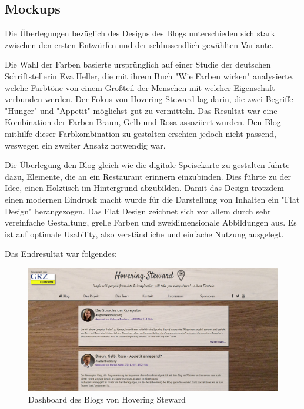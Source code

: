     \subsection*{Mockups}
    Die Überlegungen bezüglich des Designs des Blogs unterschieden sich stark zwischen den ersten
    Entwürfen und der schlussendlich gewählten Variante.

    Die Wahl der Farben basierte ursprünglich auf einer Studie der deutschen Schriftstellerin Eva Heller,
    die mit ihrem Buch {"Wie Farben wirken"\cite{WieFarbenWirken}} analysierte, welche Farbtöne von einem Großteil der Menschen
    mit welcher Eigenschaft verbunden werden. Der Fokus von Hovering Steward lag darin, die zwei Begriffe "Hunger"
    und "Appetit" möglichst gut zu vermitteln. Das Resultat war eine Kombination der Farben Braun, Gelb und Rosa
    assoziiert wurden. Den Blog mithilfe dieser Farbkombination zu gestalten erschien jedoch nicht passend, weswegen
    ein zweiter Ansatz notwendig war.

    Die Überlegung den Blog gleich wie die digitale Speisekarte zu gestalten führte dazu, Elemente, die an ein Restaurant
    erinnern einzubinden. Dies führte zu der Idee, einen Holztisch im Hintergrund abzubilden.
    Damit das Design trotzdem einen modernen Eindruck macht wurde für die Darstellung von Inhalten ein {"Flat Design"\cite{FlatDesign}}
    herangezogen. Das Flat Design zeichnet sich vor allem durch sehr vereinfache Gestaltung, grelle Farben und zweidimensionale Abbildungen aus.
    Es ist auf optimale Usability, also verständliche und einfache Nutzung ausgelegt.

    Das Endresultat war folgendes:

    \begin{figure}[H]
      \begin{centering}
      \includegraphics[width = 1\textwidth]{Bilder/blog_dashboard.jpg}
      \par\end{centering}
      \caption{Dashboard des Blogs von Hovering Steward}
      \label{blog}
    \end{figure}

